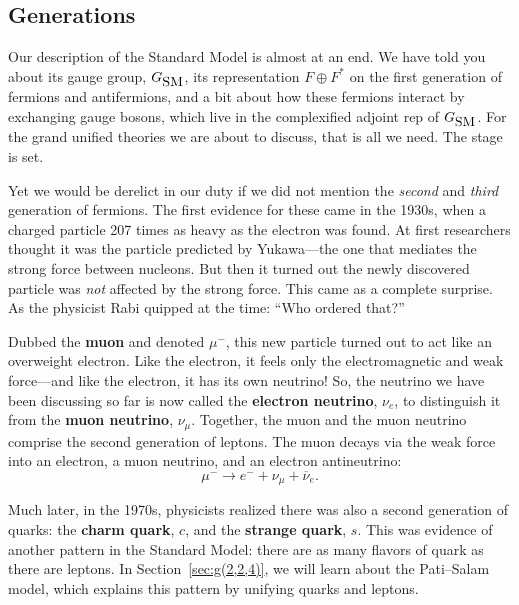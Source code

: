 \documentclass{article}
\newcommand{\GSM}{{G_{\mbox{\rm SM}}}}  %
\newcommand{\nubar}{\overline{\nu}} %
\begin{document}
\subsection{Generations} \label{sec:generations}

Our description of the Standard Model is almost at an end. We have told you
about its gauge group, $\GSM$, its representation $F \oplus F^*$ on the
first generation of fermions and antifermions, and a bit about how
these fermions interact by exchanging gauge bosons, which live in the
complexified adjoint rep of $\GSM$.  For the grand unified theories we
are about to discuss, that is all we need.  The stage is set.

Yet we would be derelict in our duty if we did not mention the
\emph{second} and \emph{third} generation of fermions.  The first
evidence for these came in the 1930s, when a charged particle 207
times as heavy as the electron was found.  At first researchers
thought it was the particle predicted by Yukawa---the one that
mediates the strong force between nucleons.  But then it 
turned out the newly discovered particle was \emph{not} affected by
the strong force.  This came as a complete surprise.  
As the physicist Rabi quipped at the time: ``Who ordered that?''

Dubbed the \textbf{muon} and denoted $\mu^-$, this new particle turned
out to act like an overweight electron.  Like the electron, it
feels only the electromagnetic and weak force---and
like the electron, it has its own neutrino!  So, the neutrino we have
been discussing so far is now called the \textbf{electron neutrino}, $\nu_e$,
to distinguish it from the \textbf{muon neutrino}, $\nu_\mu$.  Together, the
muon and the muon neutrino comprise the second generation of leptons.
The muon decays via the weak force
into an electron, a muon neutrino, and an electron antineutrino:
\[ \mu^- \to e^- + \nu_{\mu} + \nubar_e .\]

Much later, in the 1970s, physicists realized there was also a second
generation of quarks: the \textbf{charm quark}, $c$, and the
\textbf{strange quark}, $s$. This was evidence of another pattern in the
Standard Model: there are as many flavors of quark as there are
leptons. In Section~\ref{sec:g(2,2,4)}, we will learn about the
Pati--Salam model, which explains this pattern by unifying quarks and
leptons.
\end{document}
